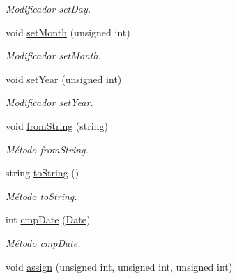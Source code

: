 \begin{DoxyCompactItemize}
\begin{DoxyCompactList}\small\item\em Modificador set\+Day. \end{DoxyCompactList}\item 
void \hyperlink{class_date_aae2c1d1158d2760ba4d5a23c528fd24d}{set\+Month} (unsigned int)\hypertarget{class_date_aae2c1d1158d2760ba4d5a23c528fd24d}{}\label{class_date_aae2c1d1158d2760ba4d5a23c528fd24d}

\begin{DoxyCompactList}\small\item\em Modificador set\+Month. \end{DoxyCompactList}\item 
void \hyperlink{class_date_abf7cafce8365f4ad601c270bb3f0f02d}{set\+Year} (unsigned int)\hypertarget{class_date_abf7cafce8365f4ad601c270bb3f0f02d}{}\label{class_date_abf7cafce8365f4ad601c270bb3f0f02d}

\begin{DoxyCompactList}\small\item\em Modificador set\+Year. \end{DoxyCompactList}\item 
void \hyperlink{class_date_a4ca1e1caba11928c842f6c62a2c851ab}{from\+String} (string)\hypertarget{class_date_a4ca1e1caba11928c842f6c62a2c851ab}{}\label{class_date_a4ca1e1caba11928c842f6c62a2c851ab}

\begin{DoxyCompactList}\small\item\em Método from\+String. \end{DoxyCompactList}\item 
string \hyperlink{class_date_adebdb45904dc2fbfacc66aa7528e0c04}{to\+String} ()
\begin{DoxyCompactList}\small\item\em Método to\+String. \end{DoxyCompactList}\item 
int \hyperlink{class_date_ae8b8f304223099e3ecf37e64232c757a}{cmp\+Date} (\hyperlink{class_date}{Date})
\begin{DoxyCompactList}\small\item\em Método cmp\+Date. \end{DoxyCompactList}\item 
void \hyperlink{class_date_a2ad9e0b62b3abea9c9d471373ce5fdef}{assign} (unsigned int, unsigned int, unsigned int)\hypertarget{class_date_a2ad9e0b62b3abea9c9d471373ce5fdef}{}\label{class_date_a2ad9e0b62b3abea9c9d471373ce5fdef}


\end{DoxyCompactItemize}
